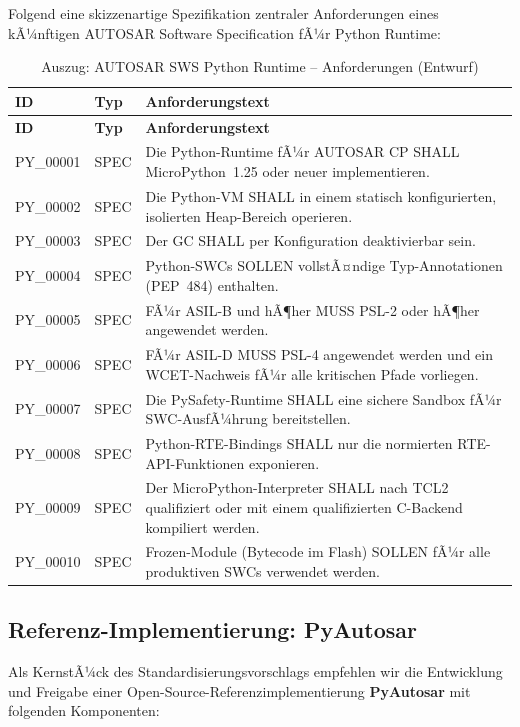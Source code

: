 ﻿\documentclass[12pt,a4paper,twoside]{article}
\begin{document}
Folgend eine skizzenartige Spezifikation zentraler Anforderungen eines
kÃ¼nftigen AUTOSAR Software Specification fÃ¼r Python Runtime:

\begin{longtable}{llp{7cm}}
\caption{Auszug: AUTOSAR SWS Python Runtime -- Anforderungen (Entwurf)}
\label{tab:sws_draft}\\
\toprule
\textbf{ID} & \textbf{Typ} & \textbf{Anforderungstext} \\
\midrule
\endfirsthead
\toprule
\textbf{ID} & \textbf{Typ} & \textbf{Anforderungstext} \\
\midrule
\endhead
\bottomrule
\endfoot
PY\_00001 & SPEC & Die Python-Runtime fÃ¼r AUTOSAR CP SHALL MicroPython~1.25 oder neuer implementieren. \\
PY\_00002 & SPEC & Die Python-VM SHALL in einem statisch konfigurierten, isolierten Heap-Bereich operieren. \\
PY\_00003 & SPEC & Der GC SHALL per Konfiguration deaktivierbar sein. \\
PY\_00004 & SPEC & Python-SWCs SOLLEN vollstÃ¤ndige Typ-Annotationen (PEP~484) enthalten. \\
PY\_00005 & SPEC & FÃ¼r ASIL-B und hÃ¶her MUSS PSL-2 oder hÃ¶her angewendet werden. \\
PY\_00006 & SPEC & FÃ¼r ASIL-D MUSS PSL-4 angewendet werden und ein WCET-Nachweis fÃ¼r alle kritischen Pfade vorliegen. \\
PY\_00007 & SPEC & Die PySafety-Runtime SHALL eine sichere Sandbox fÃ¼r SWC-AusfÃ¼hrung bereitstellen. \\
PY\_00008 & SPEC & Python-RTE-Bindings SHALL nur die normierten RTE-API-Funktionen exponieren. \\
PY\_00009 & SPEC & Der MicroPython-Interpreter SHALL nach TCL2 qualifiziert oder mit einem qualifizierten C-Backend kompiliert werden. \\
PY\_00010 & SPEC & Frozen-Module (Bytecode im Flash) SOLLEN fÃ¼r alle produktiven SWCs verwendet werden. \\
\end{longtable}

\subsection{Referenz-Implementierung: PyAutosar}
\label{subsec:pyautosar_impl}

Als KernstÃ¼ck des Standardisierungsvorschlags empfehlen wir die
Entwicklung und Freigabe einer Open-Source-Referenzimplementierung
\textbf{PyAutosar} mit folgenden Komponenten:
\end{document}
